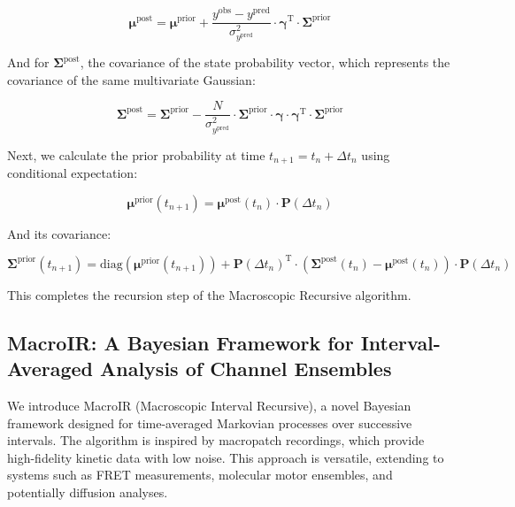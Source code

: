 \documentclass[pdflatex,sn-mathphys-num]{sn-jnl}%
\theoremstyle{thmstyleone}%
\theoremstyle{thmstyletwo}%
\theoremstyle{thmstylethree}%
\begin{document}
\begin{equation}
	\boldsymbol{\mu}^{\text{post}} = \boldsymbol{\mu}^{\text{prior}} + \frac{y^{\text{obs}} - y^{\text{pred}}}{\sigma^2_{y^{\text{pred}}}} \cdot \boldsymbol{\gamma}^{\mathrm{T}} \cdot \boldsymbol{\Sigma}^{\text{prior}}
	\label{eq:macro_mean_posterior}
\end{equation}

And for \( \boldsymbol{\Sigma}^{\text{post}} \), the covariance of the state probability vector, which represents the covariance of the same multivariate Gaussian:

\begin{equation}
	\boldsymbol{\Sigma}^{\text{post}} = \boldsymbol{\Sigma}^{\text{prior}} - \frac{N}{\sigma^2_{y^{\text{pred}}}} \cdot \boldsymbol{\Sigma}^{\text{prior}} \cdot \boldsymbol{\gamma} \cdot \boldsymbol{\gamma}^{\mathrm{T}} \cdot \boldsymbol{\Sigma}^{\text{prior}}
	\label{eq:macro_cov_posterior}
\end{equation}

Next, we calculate the prior probability at time \( t_{n+1} = t_n + \Delta t_n \) using conditional expectation:

\begin{equation}
	\boldsymbol{\mu}^{\text{prior}}(t_{n+1}) = \boldsymbol{\mu}^{\text{post}}(t_n) \cdot \mathbf{P}(\Delta t_n)
	\label{eq:macro_mean_next_prior}
\end{equation}

And its covariance:

\begin{equation}
	\boldsymbol{\Sigma}^{\text{prior}}(t_{n+1}) = \mathrm{diag}(\boldsymbol{\mu}^{\text{prior}}(t_{n+1})) + \mathbf{P}(\Delta t_n)^{\mathrm{T}} \cdot \left( \boldsymbol{\Sigma}^{\text{post}}(t_n) - \boldsymbol{\mu}^{\text{post}}(t_n) \right) \cdot \mathbf{P}(\Delta t_n)
	\label{eq:macro_mean_next_cov}
\end{equation}

This completes the recursion step of the Macroscopic Recursive algorithm.


\subsection{MacroIR: A Bayesian Framework for Interval-Averaged Analysis of Channel Ensembles}

We introduce MacroIR (Macroscopic Interval Recursive), a novel Bayesian framework designed for time-averaged Markovian processes over successive intervals. The algorithm is inspired by macropatch recordings, which provide high-fidelity kinetic data with low noise. This approach is versatile, extending to systems such as FRET measurements, molecular motor ensembles, and potentially diffusion analyses.
\end{document}
